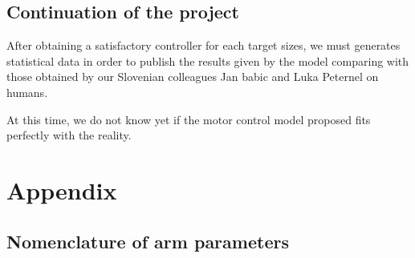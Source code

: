 \documentclass[pdftex,a4paper,12pt]{report}
\begin{document}
\section{Continuation of the project}
After obtaining a satisfactory controller for each target sizes, we must generates statistical data in order to publish the results given by the model comparing with those obtained by our Slovenian colleagues Jan babic and Luka Peternel on humans.

At this time, we do not know yet if the motor control model proposed fits perfectly with the reality.


\chapter{Appendix}
\section{Nomenclature of arm parameters}
\label{sec:params}
\end{document}
